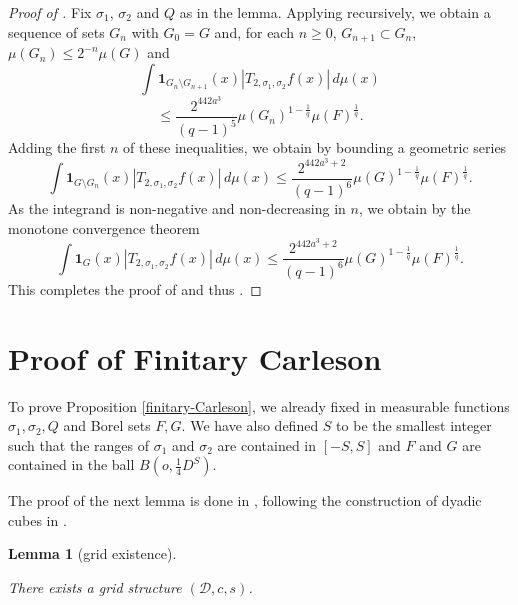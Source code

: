 \documentclass[10pt,a4paper]{article}
\theoremstyle{plain}
\newtheorem{lemma}[theorem]{Lemma}
\theoremstyle{definition}
\numberwithin{equation}{subsection}
\newcommand{\tQ}{{Q}}
\newcommand{\lean}[1]{}
\newcommand{\uses}[1]{}
\newcommand{\leanok}{}
\begin{document}
\begin{proof}[Proof of ]
\leanok
Fix $\sigma_1$, $\sigma_2$ and $\tQ$ as in the lemma. Applying  recursively, we obtain a sequence of sets $G_n$ with $G_0=G$ and, for each $n\ge 0$, $G_{n+1} \subset G_n$, $\mu(G_{n})\le 2^{-n} \mu(G)$ and
\begin{equation*}
    \int \mathbf{1}_{G_{n}\setminus G_{n+1}}(x)
    \left| {T}_{2,\sigma_1,\sigma_2} f(x) \right|\, d\mu(x)
\end{equation*}
\begin{equation}
    \le \frac{2^{442a^3}}{(q-1)^5} \mu(G_n)^{1 - \frac{1}{q}} \mu(F)^{\frac{1}{q}}.
\end{equation}
Adding the first $n$ of these inequalities, we obtain by bounding a geometric series
    \begin{equation} \label{Sqcut2}
    \int \mathbf{1}_{G\setminus G_{n}}(x)
\left| {T}_{2,\sigma_1,\sigma_2}f(x) \right|\, d\mu(x)
\le \frac{2^{442a^3+2}}{(q-1)^6} \mu(G)^{1-\frac{1}{q}} \mu(F)^{\frac{1}{q}}.
\end{equation}
As the integrand is non-negative and non-decreasing in $n$, we obtain by the monotone convergence theorem
 \begin{equation} \label{Sqcut3}
    \int \mathbf{1}_{G}(x)
\left| {T}_{2,\sigma_1,\sigma_2}f(x) \right|\, d\mu(x)
\le \frac{2^{442a^3+2}}{(q-1)^6} \mu(G)^{1-\frac{1}{q}} \mu(F)^{\frac{1}{q}}.
\end{equation}
This completes the proof of 
and thus .
\end{proof}

\section{Proof of Finitary Carleson}
\label{christsection}

To prove Proposition
\ref{finitary-Carleson}, we already fixed in 
measurable functions ${\sigma_1},\sigma_2, \tQ$ and Borel sets $F,G$. We have also
defined $S$ to be the smallest
integer such that the ranges of
$\sigma_1$ and $\sigma_2$ are contained in $[-S,S]$ and $F$ and $G$ are contained
in the ball $B(o, \frac 14 D^S)$.


The proof of the next lemma is done in ,
following the construction of dyadic cubes in \cite[\S 3]{christ1990b}.

\begin{lemma}[grid existence]
    \label{grid-existence}
    \leanok
    \lean{grid_existence}
    \uses{counting-balls,boundary-measure} There exists a grid structure $(\mathcal{D}, c,s)$.
\end{lemma}
\end{document}
